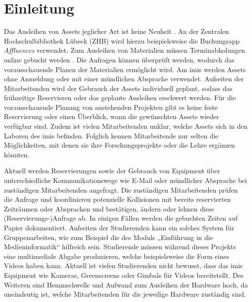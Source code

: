 
\chapter{Einleitung}

Das Ausleihen von Assets jeglicher Art ist keine Neuheit \cite{soderholm2018borrowing}. An der
Zentralen Hochschulbibliothek Lübeck (ZHB) wird hierzu beispielsweise die Buchungsapp
\textit{Affluences} verwendet. Zum Ausleihen von Materialien müssen Terminabholungen online gebucht
werden \cite{zhb_offnung_nodate}. Die Anfragen können überprüft werden, wodurch das vorausschauende Planen
der Materialien ermöglicht wird. Am \ac{imis} werden Assets ohne Anmeldung oder mit einer mündlichen
Absprache verwendet. Aufseiten der Mitarbeitenden wird der Gebrauch der Assets individuell geplant,
sodass das frühzeitige Reservieren oder das geplante Ausleihen erschwert werden. Für die
vorausschauende Planung von anstehenden Projekten gibt es keine feste Reservierung oder einen
Überblick, wann die gewünschten Assets wieder verfügbar sind. Zudem ist vielen Mitarbeitenden
unklar, welche Assets sich in den Laboren des \ac{imis} befinden. Folglich kennen Mitarbeitende nur
selten die Möglichkeiten, mit denen sie ihre Forschungsprojekte oder die Lehre ergänzen könnten.

Aktuell werden Reservierungen sowie der Gebrauch von Equipment über unterschiedliche
Kommunikationswege wie E-Mail oder mündlicher Absprache bei zuständigen Mitarbeitenden angefragt. Die
zuständigen Mitarbeitenden prüfen die Anfrage und koordinieren potenzielle Kollisionen mit bereits
reservierten Zeiträumen oder Absprachen und bestätigen, ändern oder lehnen diese
(Reservierungs-)Anfrage ab. In einigen Fällen werden die gebuchten Zeiten auf Papier dokumentiert.
Aufseiten der Studierenden kann ein solches System für Gruppenarbeiten, wie zum Beispiel die des Moduls
„Einführung in die Medieninformatik“ hilfreich sein. Studierende müssen während dieses Projekts eine
multimediale Abgabe produzieren, welche beispielsweise die Form eines Videos haben kann. Aktuell ist
vielen Studierenden nicht bewusst, dass das \ac{imis} Equipment wie Kameras, Greenscreens oder Gimbals für
Videos bereitstellt. Des Weiteren sind Hemmschwelle und Aufwand zum Ausleihen der Hardware hoch, da
uneindeutig ist, welche Mitarbeitenden für die jeweilige Hardware zuständig sind.


